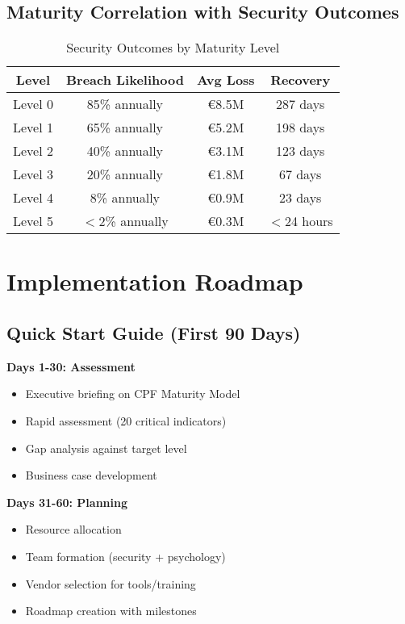 \documentclass[11pt,a4paper]{article}
\begin{document}
\subsection{Maturity Correlation with Security Outcomes}

\begin{table}[h]
\centering
\caption{Security Outcomes by Maturity Level}
\begin{tabular}{cccc}
\toprule
\textbf{Level} & \textbf{Breach Likelihood} & \textbf{Avg Loss} & \textbf{Recovery} \\
\midrule
Level 0 & 85\% annually & €8.5M & 287 days \\
Level 1 & 65\% annually & €5.2M & 198 days \\
Level 2 & 40\% annually & €3.1M & 123 days \\
Level 3 & 20\% annually & €1.8M & 67 days \\
Level 4 & 8\% annually & €0.9M & 23 days \\
Level 5 & $<$2\% annually & €0.3M & $<$24 hours \\
\bottomrule
\end{tabular}
\end{table}

\section{Implementation Roadmap}

\subsection{Quick Start Guide (First 90 Days)}

\textbf{Days 1-30: Assessment}
\begin{itemize}
\item Executive briefing on CPF Maturity Model
\item Rapid assessment (20 critical indicators)
\item Gap analysis against target level
\item Business case development
\end{itemize}

\textbf{Days 31-60: Planning}
\begin{itemize}
\item Resource allocation
\item Team formation (security + psychology)
\item Vendor selection for tools/training
\item Roadmap creation with milestones
\end{itemize}
\end{document}
